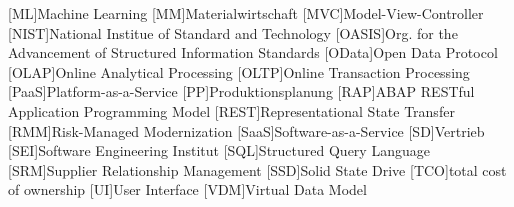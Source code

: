 \begin{acronym}[XXXXXXX]
		[ML]{Machine Learning}
		[MM]{Materialwirtschaft}
		[MVC]{Model-View-Controller}
		{National Institue of Standard and Technology}
		[OASIS]{Org. for the Advancement of Structured Information Standards}
		[OData]{Open Data Protocol}
		{Online Analytical Processing}
		{Online Transaction Processing}
		{Platform-as-a-Service}
		[PP]{Produktionsplanung}
		[RAP]{ABAP RESTful Application Programming Model}
		{Representational State Transfer}
		[RMM]{Risk-Managed Modernization}
		{Software-as-a-Service}
		[SD]{Vertrieb}
		[SEI]{Software Engineering Institut}
		[SQL]{Structured Query Language}
		[SRM]{Supplier Relationship Management}
		[SSD]{Solid State Drive}
		[TCO]{total cost of ownership}
		[UI]{User Interface}
		[VDM]{Virtual Data Model}

	\end{acronym}


\newpage